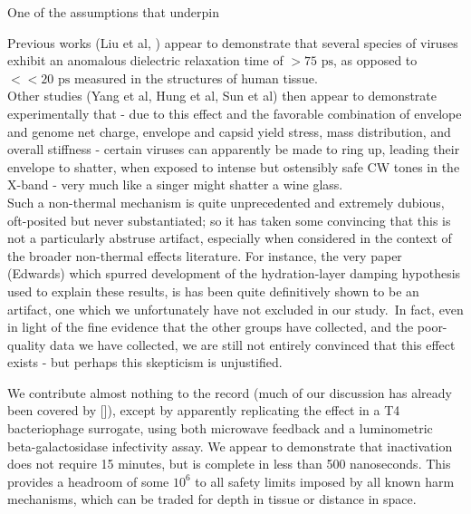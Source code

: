 \documentclass[paper.tex]{subfiles}
\begin{document}
One of the assumptions that underpin 



Previous works (Liu et al, ) appear to demonstrate that several species of viruses exhibit an anomalous dielectric relaxation time of $> 75 \text{ ps}$, as opposed to $<< 20 \text{ ps}$ \footnotemark measured in the structures of human tissue.\\

Other studies (Yang et al, Hung et al, Sun et al) then appear to demonstrate experimentally that - due to this effect and the favorable combination of envelope and genome net charge, envelope and capsid yield stress, mass distribution, and overall stiffness - certain viruses can  apparently be made to ring up, leading their envelope to shatter, when exposed to intense but ostensibly safe CW tones in the X-band - very much like a singer might shatter a wine glass.\\

Such a non-thermal mechanism is quite unprecedented and extremely dubious, oft-posited but never substantiated; so it has taken some convincing that this is not a particularly abstruse artifact, especially when considered in the context of the broader non-thermal effects literature. For instance, the very paper (Edwards) which spurred development of the hydration-layer damping hypothesis used to explain these results, is has been quite\cite{Resonances1987} definitively\cite{Microwave1993a} shown to be an artifact, one which we unfortunately have not excluded in our study.\footnotemark \ In fact, even in light of the fine evidence that the other groups have collected, and the poor-quality data we have collected, we are still not entirely convinced that this effect exists - but perhaps this skepticism is unjustified.\\


We contribute almost nothing to the record (much of our discussion has already been covered by []), except by apparently replicating the effect in a T4 bacteriophage surrogate, using both microwave feedback and a luminometric beta-galactosidase infectivity assay. We appear to demonstrate that inactivation does not require 15 minutes, but is complete in less than 500 nanoseconds. This provides a headroom of some $10^6$ to all safety limits imposed by all known harm mechanisms, which can be traded for depth in tissue or distance in space. \\
\end{document}
